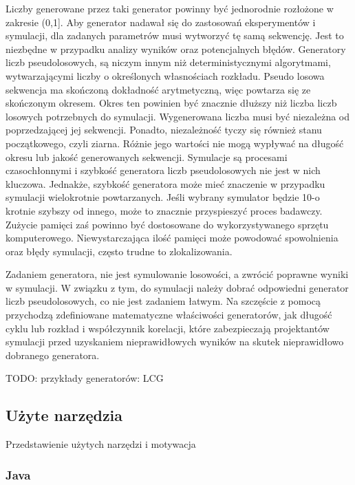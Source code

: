 Liczby generowane przez taki generator powinny być jednorodnie rozłożone w zakresie (0,1{]}. Aby generator nadawał się do zastosowań eksperymentów i symulacji, dla zadanych parametrów musi wytworzyć tę samą sekwencję. Jest to niezbędne w przypadku analizy wyników oraz potencjalnych błędów. Generatory liczb pseudolosowych, są niczym innym niż deterministycznymi algorytmami, wytwarzającymi liczby o określonych własnościach rozkładu. Pseudo losowa sekwencja ma skończoną dokładność arytmetyczną, więc powtarza się ze skończonym okresem. Okres ten powinien być znacznie dłuższy niż liczba liczb losowych potrzebnych do symulacji. Wygenerowana liczba musi być niezależna od poprzedzającej jej sekwencji. Ponadto, niezależność tyczy się również stanu początkowego, czyli ziarna. Różnie jego wartości nie mogą wypływać na długość okresu lub jakość generowanych sekwencji. Symulacje są procesami czasochłonnymi i szybkość generatora liczb pseudolosowych nie jest w nich kluczowa. Jednakże, szybkość generatora może mieć znaczenie w przypadku symulacji wielokrotnie powtarzanych. Jeśli wybrany symulator będzie 10-o krotnie szybszy od innego, może to znacznie przyspieszyć proces badawczy. Zużycie pamięci zaś powinno być dostosowane do wykorzystywanego sprzętu komputerowego. Niewystarczająca ilość pamięci może powodować spowolnienia oraz błędy symulacji, często trudne to zlokalizowania.

Zadaniem generatora, nie jest symulowanie losowości, a zwrócić poprawne wyniki w symulacji. W związku z tym, do symulacji należy dobrać odpowiedni generator liczb pseudolosowych, co nie jest zadaniem łatwym. Na szczęście z pomocą przychodzą zdefiniowane matematyczne właściwości generatorów, jak długość cyklu lub rozkład i współczynnik korelacji, które zabezpieczają projektantów symulacji przed uzyskaniem nieprawidłowych wyników na skutek nieprawidłowo dobranego generatora.

TODO: przykłady generatorów: LCG

\subsection{Użyte narzędzia}\label{uux17cyte-narzux119dzia}

Przedstawienie użytych narzędzi i motywacja

\subsubsection{Java}\label{java}

